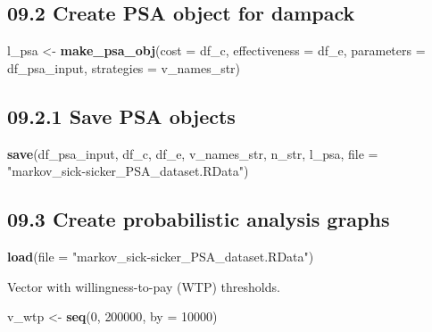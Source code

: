 \documentclass[
]{article}
\newenvironment{Shaded}{\begin{snugshade}}{\end{snugshade}}
\newcommand{\DataTypeTok}[1]{\textcolor[rgb]{0.13,0.29,0.53}{#1}}
\newcommand{\DecValTok}[1]{\textcolor[rgb]{0.00,0.00,0.81}{#1}}
\newcommand{\KeywordTok}[1]{\textcolor[rgb]{0.13,0.29,0.53}{\textbf{#1}}}
\newcommand{\NormalTok}[1]{#1}
\newcommand{\StringTok}[1]{\textcolor[rgb]{0.31,0.60,0.02}{#1}}
\begin{document}
\hypertarget{create-psa-object-for-dampack}{%
\subsection{09.2 Create PSA object for
dampack}\label{create-psa-object-for-dampack}}

\begin{Shaded}
\begin{Highlighting}[]
\NormalTok{l_psa <-}\StringTok{ }\KeywordTok{make_psa_obj}\NormalTok{(}\DataTypeTok{cost          =}\NormalTok{ df_c, }
                      \DataTypeTok{effectiveness =}\NormalTok{ df_e, }
                      \DataTypeTok{parameters    =}\NormalTok{ df_psa_input, }
                      \DataTypeTok{strategies    =}\NormalTok{ v_names_str)}
\end{Highlighting}
\end{Shaded}

\hypertarget{save-psa-objects}{%
\subsection{09.2.1 Save PSA objects}\label{save-psa-objects}}

\begin{Shaded}
\begin{Highlighting}[]
\KeywordTok{save}\NormalTok{(df_psa_input, df_c, df_e, v_names_str, n_str, l_psa,}
     \DataTypeTok{file =} \StringTok{"markov_sick-sicker_PSA_dataset.RData"}\NormalTok{)}
\end{Highlighting}
\end{Shaded}

\hypertarget{create-probabilistic-analysis-graphs}{%
\subsection{09.3 Create probabilistic analysis
graphs}\label{create-probabilistic-analysis-graphs}}

\begin{Shaded}
\begin{Highlighting}[]
\KeywordTok{load}\NormalTok{(}\DataTypeTok{file =} \StringTok{"markov_sick-sicker_PSA_dataset.RData"}\NormalTok{)}
\end{Highlighting}
\end{Shaded}

Vector with willingness-to-pay (WTP) thresholds.

\begin{Shaded}
\begin{Highlighting}[]
\NormalTok{v_wtp <-}\StringTok{ }\KeywordTok{seq}\NormalTok{(}\DecValTok{0}\NormalTok{, }\DecValTok{200000}\NormalTok{, }\DataTypeTok{by =} \DecValTok{10000}\NormalTok{)}
\end{Highlighting}
\end{Shaded}
\end{document}
